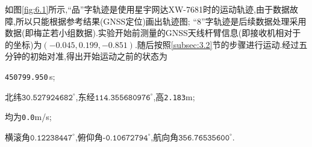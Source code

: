 \documentclass[10pt,a4paper]{ctexart}
\begin{document}
如图\ref{fig:6.1}所示,``品''字轨迹是使用星宇网达\textsf{XW-7681}时的运动轨迹,由于\IMU 数据故障,所以只能根据参考结果(\textsf{GNSS}定位)画出轨迹图; ``8''字轨迹是后续数据处理采用数据(即梅芷若小组数据).实验开始前测量的\textsf{GNSS}天线杆臂信息(即接收机相对于\IMU 的坐标)为$(-0.045,0.199,-0.851)$.随后按照\ref{subsec:3.2}节的步骤进行运动.经过五分钟的初始对准,得出开始运动之前的状态为
\begin{description}[nosep]
    \item[初始时间:] \texttt{450799.950}\,s;
    \item[初始位置:] 北纬$\texttt{30.527924682}^{\circ}$,东经$\texttt{114.355680976}^{\circ}$,高\texttt{2.183}m;
    \item[初始速度:] 均为\texttt{0.0}m/s;
    \item[初始姿态:] 横滚角$\texttt{0.12238447}^{\circ}$,俯仰角$\texttt{-0.10672794}^{\circ}$,航向角$\texttt{356.76535600}^{\circ}$.
\end{description}
\end{document}

